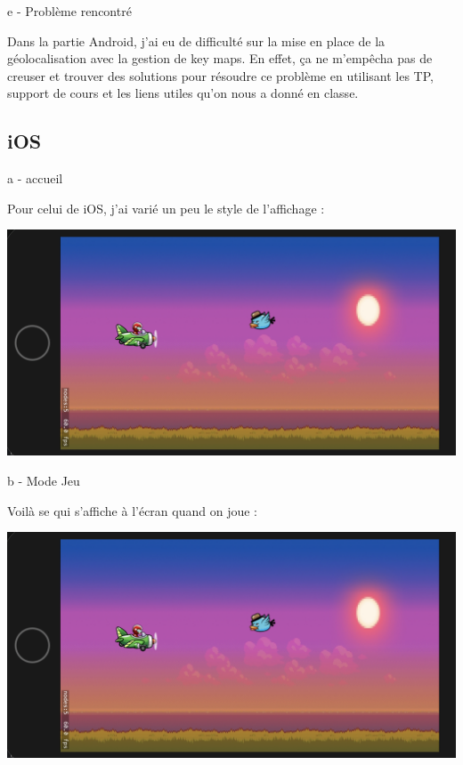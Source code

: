 \documentclass{rapportECL}
\begin{document}
e - Problème rencontré

Dans la partie Android, j'ai eu de difficulté sur la mise en place de la géolocalisation avec la gestion de key maps. En effet, ça ne m'empêcha pas de creuser et trouver des solutions pour résoudre ce problème en utilisant les TP, support de cours et les liens utiles\cite{Cours} qu'on nous a donné en classe.

\newpage
\subsection{iOS}
a - accueil

Pour celui de iOS, j'ai varié un peu le style de l'affichage : 

\begin{center}
    \includegraphics[scale = 0.5]{logos/JeuiOS.png}
\end{center}

b - Mode Jeu

Voilà se qui s'affiche à l'écran quand on joue : 

\begin{center}
    \includegraphics[scale = 0.5]{logos/JeuiOS.png}
\end{center}
\end{document}
